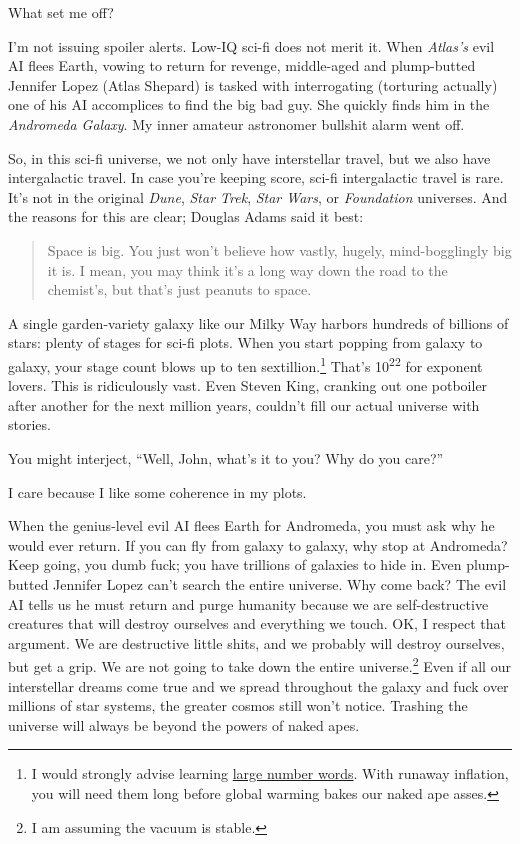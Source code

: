 What set me off?

I'm not issuing spoiler alerts. Low-IQ sci-fi does not merit it. When
\emph{Atlas's} evil AI flees Earth, vowing to return for revenge,
middle-aged and plump-butted Jennifer Lopez (Atlas Shepard) is tasked
with interrogating (torturing actually) one of his AI accomplices to
find the big bad guy. She quickly finds him in the \emph{Andromeda
Galaxy}. My inner amateur astronomer bullshit alarm went off.

So, in this sci-fi universe, we not only have interstellar travel, but
we also have intergalactic travel. In case you're keeping score, sci-fi
intergalactic travel is rare. It's not in the original \emph{Dune},
\emph{Star Trek}, \emph{Star Wars}, or \emph{Foundation} universes. And
the reasons for this are clear; Douglas Adams said it best:

\begin{quote}
Space is big. You just won't believe how vastly, hugely, mind-bogglingly
big it is. I mean, you may think it's a long way down the road to the
chemist's, but that's just peanuts to space.
\end{quote}

A single garden-variety galaxy like our Milky Way harbors hundreds of
billions of stars: plenty of stages for sci-fi plots. When you start
popping from galaxy to galaxy, your stage count blows up to ten
sextillion.\footnote{I would strongly advise learning
\href{https://lcn2.github.io/mersenne-english-name/tenpower/tenpower.html}{large number words}. With runaway inflation, you will need them long before
global warming bakes our naked ape asses.
} That's 10\textsuperscript{22} for exponent lovers. This is ridiculously
vast. Even Steven King, cranking out one potboiler after another for the
next million years, couldn't fill our actual universe with stories.

You might interject, ``Well, John, what's it to you? Why do you care?''

I care because I like some coherence in my plots.

When the genius-level evil AI flees Earth for Andromeda, you must ask
why he would ever return. If you can fly from galaxy to galaxy, why stop
at Andromeda? Keep going, you dumb fuck; you have trillions of galaxies
to hide in. Even plump-butted Jennifer Lopez can't search the entire
universe. Why come back? The evil AI tells us he must return and purge
humanity because we are self-destructive creatures that will destroy
ourselves and everything we touch. OK, I respect that argument. We are
destructive little shits, and we probably will destroy ourselves, but
get a grip. We are not going to take down the entire
universe.\footnote{I am assuming the vacuum is stable.}
Even if all our interstellar dreams come true and we spread throughout
the galaxy and fuck over millions of star systems, the greater cosmos
still won't notice. Trashing the universe will always be beyond the
powers of naked apes.

